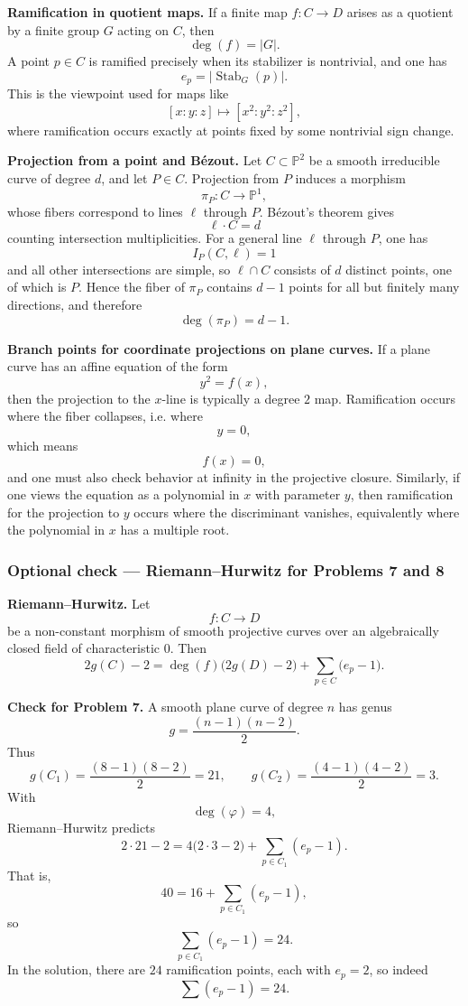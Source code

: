 \documentclass[12pt,a4paper]{article}
\theoremstyle{plain}
\theoremstyle{definition}      %
\begin{document}
\textbf{Ramification in quotient maps.}
If a finite map \(f:C\to D\) arises as a quotient by a finite group \(G\) acting on \(C\), then
\[
\deg(f)=|G|.
\]
A point \(p\in C\) is ramified precisely when its stabilizer is nontrivial, and one has
\[
e_p = |\operatorname{Stab}_G(p)|.
\]
This is the viewpoint used for maps like
\[
[x:y:z]\mapsto [x^2:y^2:z^2],
\]
where ramification occurs exactly at points fixed by some nontrivial sign change.

\textbf{Projection from a point and Bézout.}
Let \(C\subset \mathbb P^2\) be a smooth irreducible curve of degree \(d\), and let \(P\in C\).
Projection from \(P\) induces a morphism
\[
\pi_P:C\to \mathbb P^1,
\]
whose fibers correspond to lines \(\ell\) through \(P\).
Bézout's theorem gives
\[
\ell\cdot C = d
\]
counting intersection multiplicities.
For a general line \(\ell\) through \(P\), one has
\[
I_P(C,\ell)=1
\]
and all other intersections are simple, so \(\ell\cap C\) consists of \(d\) distinct points, one of which is \(P\).
Hence the fiber of \(\pi_P\) contains \(d-1\) points for all but finitely many directions, and therefore
\[
\deg(\pi_P)=d-1.
\]

\textbf{Branch points for coordinate projections on plane curves.}
If a plane curve has an affine equation of the form
\[
y^2 = f(x),
\]
then the projection to the \(x\)-line is typically a degree \(2\) map.
Ramification occurs where the fiber collapses, i.e. where
\[
y=0,
\]
which means
\[
f(x)=0,
\]
and one must also check behavior at infinity in the projective closure.
Similarly, if one views the equation as a polynomial in \(x\) with parameter \(y\), then ramification for the projection to \(y\) occurs where the discriminant vanishes, equivalently where the polynomial in \(x\) has a multiple root.


\subsubsection*{Optional check — Riemann--Hurwitz for Problems 7 and 8}

\textbf{Riemann--Hurwitz.}
Let
\[
f:C\to D
\]
be a non-constant morphism of smooth projective curves over an algebraically closed field of characteristic \(0\).
Then
\[
2g(C)-2
=
\deg(f)\bigl(2g(D)-2\bigr)
+
\sum_{p\in C}\bigl(e_p-1\bigr).
\]

\textbf{Check for Problem 7.}
A smooth plane curve of degree \(n\) has genus
\[
g=\frac{(n-1)(n-2)}{2}.
\]
Thus
\[
g(C_1)=\frac{(8-1)(8-2)}{2}=21,
\qquad
g(C_2)=\frac{(4-1)(4-2)}{2}=3.
\]
With
\[
\deg(\varphi)=4,
\]
Riemann--Hurwitz predicts
\[
2\cdot 21-2
=
4\bigl(2\cdot 3-2\bigr)
+
\sum_{p\in C_1}(e_p-1).
\]
That is,
\[
40
=
16
+
\sum_{p\in C_1}(e_p-1),
\]
so
\[
\sum_{p\in C_1}(e_p-1)=24.
\]
In the solution, there are \(24\) ramification points, each with \(e_p=2\), so indeed
\[
\sum (e_p-1)=24.
\]
\end{document}
